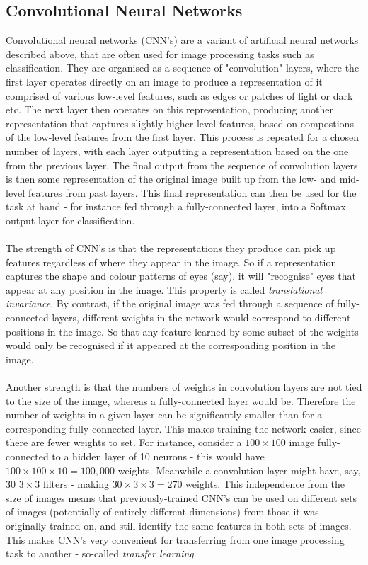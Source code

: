 \documentclass[11pt]{article} %
\theoremstyle{plain}
\theoremstyle{definition}
\begin{document}
\subsection{Convolutional Neural Networks}
Convolutional neural networks (CNN's) are a variant of artificial neural networks described above, that are often used for image processing tasks such as classification. They are organised as a sequence of "convolution" layers, where the first layer operates directly on an image to produce a representation of it comprised of various low-level features, such as edges or patches of light or dark etc. The next layer then operates on this representation, producing another representation that captures slightly higher-level features, based on compostions of the low-level features from the first layer. This process is repeated for a chosen number of layers, with each layer outputting a representation based on the one from the previous layer. The final output from the sequence of convolution layers is then some representation of the original image built up from the low- and mid-level features from past layers. This final representation can then be used for the task at hand - for instance fed through a fully-connected layer, into a Softmax output layer for classification.     
\\
\\
\noindent
The strength of CNN's is that the representations they produce can pick up features regardless of where they appear in the image. So if a representation captures the shape and colour patterns of eyes (say), it will "recognise" eyes that appear at any position in the image. This property is called \textit{translational invariance}. By contrast, if the original image was fed through a sequence of fully-connected layers, different weights in the network would correspond to different positions in the image. So that any feature learned by some subset of the weights would only be recognised if it appeared at the corresponding position in the image.
\\
\\
\noindent
Another strength is that the numbers of weights in convolution layers are not tied to the size of the image, whereas a fully-connected layer would be. Therefore the number of weights in a given layer can be significantly smaller than for a corresponding fully-connected layer. This makes training the network easier, since there are fewer weights to set. For instance, consider a \(100 \times 100\) image fully-connected to a hidden layer of 10 neurons - this would have \(100 \times 100 \times 10 = 100,000\) weights. Meanwhile a convolution layer might have, say, 30 \(3 \times 3\) filters - making \(30 \times 3 \times 3 = 270\) weights. This independence from the size of images means that previously-trained CNN's can be used on different sets of images (potentially of entirely different dimensions) from those it was originally trained on, and still identify the same features in both sets of images. This makes CNN's very convenient for transferring from one image processing task to another - so-called \textit{transfer learning}. 
\end{document}
